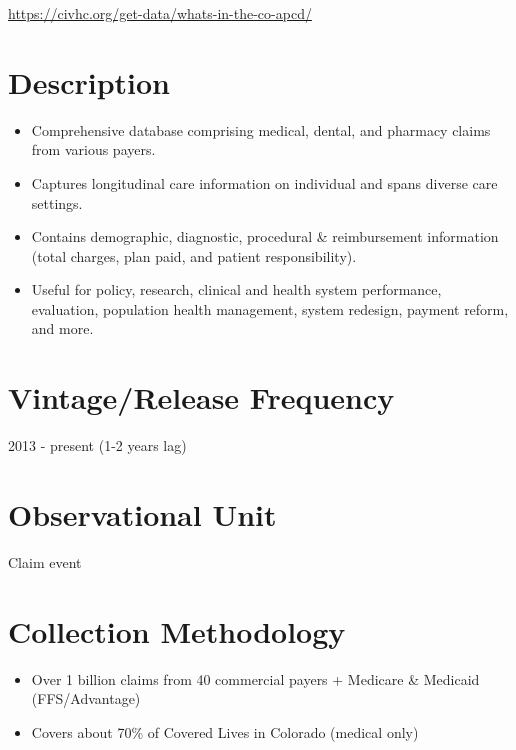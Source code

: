 \documentclass[
]{book}
\providecommand{\tightlist}{%
  \setlength{\itemsep}{0pt}\setlength{\parskip}{0pt}}
\begin{document}
\url{https://civhc.org/get-data/whats-in-the-co-apcd/}

\hypertarget{description-16}{%
\section{Description}\label{description-16}}

\begin{itemize}
\tightlist
\item
  Comprehensive database comprising medical, dental, and pharmacy claims from various payers.
\item
  Captures longitudinal care information on individual and spans diverse care settings.
\item
  Contains demographic, diagnostic, procedural \& reimbursement information (total charges, plan paid, and patient responsibility).
\item
  Useful for policy, research, clinical and health system performance, evaluation, population health management, system redesign, payment reform, and more.
\end{itemize}

\hypertarget{vintagerelease-frequency-16}{%
\section{Vintage/Release Frequency}\label{vintagerelease-frequency-16}}

2013 - present (1-2 years lag)

\hypertarget{observational-unit-16}{%
\section{Observational Unit}\label{observational-unit-16}}

Claim event

\hypertarget{collection-methodology-16}{%
\section{Collection Methodology}\label{collection-methodology-16}}

\begin{itemize}
\tightlist
\item
  Over 1 billion claims from 40 commercial payers + Medicare \& Medicaid (FFS/Advantage)
\item
  Covers about 70\% of Covered Lives in Colorado (medical only)
\end{itemize}
\end{document}
